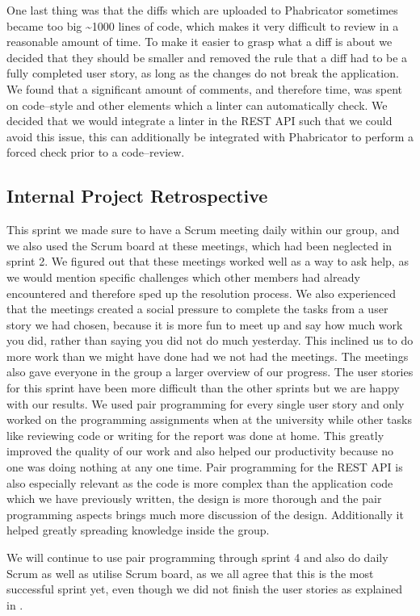 One last thing was that the diffs which are uploaded to Phabricator sometimes became too big \textasciitilde 1000 lines of code, which makes it very difficult to review in a reasonable amount of time.
To make it easier to grasp what a diff is about we decided that they should be smaller and removed the rule that a diff had to be a fully completed user story, as long as the changes do not break the application.
We found that a significant amount of comments, and therefore time, was spent on code--style and other elements which a linter can automatically check.
We decided that we would integrate a linter in the REST API such that we could avoid this issue, this can additionally be integrated with Phabricator to perform a forced check prior to a code--review.

\subsection*{Internal Project Retrospective}
This sprint we made sure to have a Scrum meeting daily within our group, and we also used the Scrum board at these meetings, which had been neglected in sprint 2. 
We figured out that these meetings worked well as a way to ask help, as we would mention specific challenges which other members had already encountered and therefore sped up the resolution process.
We also experienced that the meetings created a social pressure to complete the tasks from a user story we had chosen, because it is more fun to meet up and say how much work you did, rather than saying you did not do much yesterday.
This inclined us to do more work than we might have done had we not had the meetings.
The meetings also gave everyone in the group a larger overview of our progress.
The user stories for this sprint have been more difficult than the other sprints but we are happy with our results.
We used pair programming for every single user story and only worked on the programming assignments when at the university while other tasks like reviewing code or writing for the report was done at home.
This greatly improved the quality of our work and also helped our productivity because no one was doing nothing at any one time.
Pair programming for the REST API is also especially relevant as the code is more complex than the application code which we have previously written, the design is more thorough and the pair programming aspects brings much more discussion of the design.
Additionally it helped greatly spreading knowledge inside the group.

We will continue to use pair programming through sprint 4 and also do daily Scrum as well as utilise Scrum board, as we all agree that this is the most successful sprint yet, even though we did not finish the user stories as explained in .

